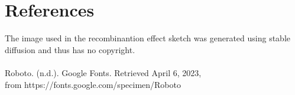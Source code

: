 \documentclass[12pt,a4paper]{article}
\begin{document}
	\section{References}
		The image used in the recombinantion effect sketch was generated using stable diffusion and thus 
		has no copyright.\\\\
		Roboto. (n.d.). Google Fonts. Retrieved April 6, 2023, \\from https://fonts.google.com/specimen/Roboto
\end{document}
